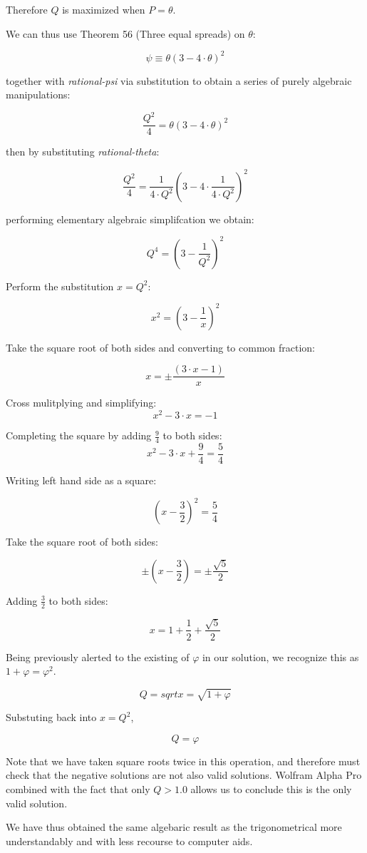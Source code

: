 \documentclass[11pt]{article}
\begin{document}
Therefore $Q$ is maximized when $P = \theta$.

We can thus use Theorem 56 (Three equal spreads) \cite{wildberger2005} on $\theta$:

\[  \psi \equiv \theta (3 - 4 \cdot \theta)^2  \]

together with \textit{rational-psi} via substitution to obtain a series of purely algebraic manipulations:

\[  \frac{Q^2}{4} = \theta (3 - 4 \cdot \theta)^2  \]

then by substituting \textit{rational-theta}:

\[  \frac{Q^2}{4} = \frac{1}{4 \cdot Q^2} (3 - 4 \cdot \frac{1}{4 \cdot Q^2})^2  \]

performing elementary algebraic simplifcation we obtain:

\[  Q^4 = (3 - \frac{1}{Q^2})^2   \]

Perform the substitution $x = Q^2$:

\[  x^2 = (3 - \frac{1}{x})^2   \]

Take the square root of both sides and converting to common fraction:

\[  x = \pm \frac{(3\cdot x - 1)}{x}   \]

Cross mulitplying and simplifying:
\[  x^2 - 3\cdot x =  - 1   \]

Completing the square by adding $\frac{9}{4}$ to both sides:
\[  x^2 - 3\cdot x + \frac{9}{4} =  \frac{5}{4}   \]

Writing left hand side as a square:

\[  (x- \frac{3}{2})^2 =  \frac{5}{4}   \]

Take the square root of both sides:

\[  \pm (x- \frac{3}{2}) =  \pm \frac{\sqrt{5}}{2}   \]

Adding $\frac{3}{2}$ to both sides:

\[  x =   1 + \frac{1}{2} + \frac{\sqrt{5}}{2}   \]

Being previously alerted to the existing of $\varphi$ in our solution, we recognize
this as $1 + \varphi = \varphi^2$. 

\[  Q = sqrt{x}  =   \sqrt{1 + \varphi}  \]

Substuting back into $x = Q ^ 2$,

\[  Q =   \varphi  \]

Note that we have taken square roots twice in this operation, and therefore must
check that the negative solutions are not also valid solutions. Wolfram Alpha Pro
combined with the fact that only $Q > 1.0$ allows us to conclude this is the
only valid solution.

We have thus obtained the same algebaric result as the trigonometrical more understandably
and with less recourse to computer aids.



  
\end{document}
